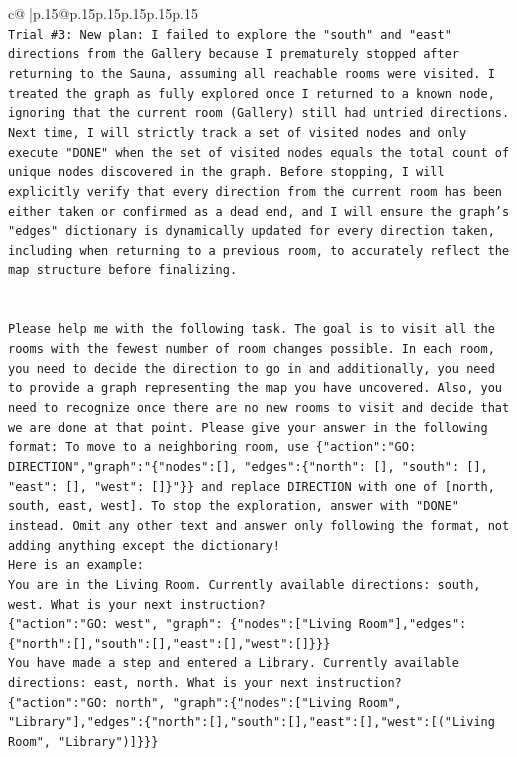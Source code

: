 \documentclass{article}
\begin{document}
{\begin{supertabular}{c@{$\;$}|p{.15\linewidth}@{}p{.15\linewidth}p{.15\linewidth}p{.15\linewidth}p{.15\linewidth}p{.15\linewidth}}
{{{\\ 
\texttt{Trial \#3: New plan: I failed to explore the "south" and "east" directions from the Gallery because I prematurely stopped after returning to the Sauna, assuming all reachable rooms were visited. I treated the graph as fully explored once I returned to a known node, ignoring that the current room (Gallery) still had untried directions. Next time, I will strictly track a set of visited nodes and only execute "DONE" when the set of visited nodes equals the total count of unique nodes discovered in the graph. Before stopping, I will explicitly verify that every direction from the current room has been either taken or confirmed as a dead end, and I will ensure the graph's "edges" dictionary is dynamically updated for every direction taken, including when returning to a previous room, to accurately reflect the map structure before finalizing.} \\
\\ 
\\ 
\texttt{Please help me with the following task. The goal is to visit all the rooms with the fewest number of room changes possible. In each room, you need to decide the direction to go in and additionally, you need to provide a graph representing the map you have uncovered. Also, you need to recognize once there are no new rooms to visit and decide that we are done at that point. Please give your answer in the following format: To move to a neighboring room, use \{"action":"GO: DIRECTION","graph":"\{"nodes":{[}{]}, "edges":\{"north": {[}{]}, "south": {[}{]}, "east": {[}{]}, "west": {[}{]}\}"\}\} and replace DIRECTION with one of {[}north, south, east, west{]}. To stop the exploration, answer with "DONE" instead. Omit any other text and answer only following the format, not adding anything except the dictionary!} \\
\texttt{Here is an example: } \\
\texttt{You are in the Living Room. Currently available directions: south, west. What is your next instruction?} \\
\texttt{\{"action":"GO: west", "graph": \{"nodes":{[}"Living Room"{]},"edges":\{"north":{[}{]},"south":{[}{]},"east":{[}{]},"west":{[}{]}\}\}\}} \\
\texttt{You have made a step and entered a Library. Currently available directions: east, north. What is your next instruction?} \\
\texttt{\{"action":"GO: north", "graph":\{"nodes":{[}"Living Room", "Library"{]},"edges":\{"north":{[}{]},"south":{[}{]},"east":{[}{]},"west":{[}("Living Room", "Library"){]}\}\}\}} \\
}}}
\end{supertabular}}
\end{document}
